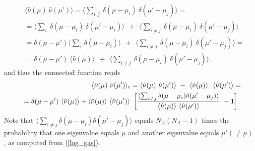 \documentclass[aps,prb,preprint,onecolumn,amsmath,amssymb,superscriptaddress,eqsecnum,floatfix,scrartcl]{revtex4-1}
\begin{document}
\begin{eqnarray}\nonumber
&& \langle{\hat \nu}(\mu) \ {\hat \nu}(\mu')\rangle=
\langle \sum_{i,j} \ \delta(\mu-\mu_i) \  \delta(\mu'-\mu_j)\rangle= \\ \nonumber
&&=
\langle \sum_{i} \ \delta(\mu-\mu_i) \  \delta(\mu'-\mu_i)\rangle
\ \ 
+
\ \ 
\langle \sum_{i \not = j} \ \delta(\mu-\mu_i) \  \delta(\mu'-\mu_j)\rangle \\ \nonumber
&& =
\delta(\mu-\mu') 
\langle \sum_{i} \ \delta(\mu-\mu_i) \rangle
\ \ 
+
\ \ 
\langle \sum_{i \not = j} \ \delta(\mu-\mu_i) \  \delta(\mu'-\mu_j)\rangle = \\ 
\label{DEFLevelLevelTwoPointFunction}
&&=
\delta(\mu-\mu')  \ 
\langle {\hat \nu}(\mu) \rangle
\ \ 
+
\ \ 
\langle \sum_{i \not = j} \ \delta(\mu-\mu_i) \  \delta(\mu'-\mu_j)\rangle,
\end{eqnarray}
and thus  the connected function reads 
\begin{eqnarray}\nonumber
&& \langle{ \hat \nu}(\mu) \ {\hat \nu}(\mu')\rangle_c=
\langle{\hat  \nu}(\mu) \ {\hat \nu}(\mu')\rangle
\ - \ 
\langle{\hat \nu}(\mu)\rangle \  \  \langle{\hat \nu}(\mu')\rangle =  \\  \label{RescaledConnectedLevelLevelCorrelatorMu}
&&=
\delta(\mu-\mu')  \
\langle { \hat \nu}(\mu) \rangle
+
\langle{\hat \nu}(\mu)\rangle \    \langle{\hat \nu}(\mu')\rangle  \  
 \left [
{
\langle \sum_{i \not = j}  \delta(\mu-\mu_i)   \delta(\mu'-\mu_j)\rangle 
\over \langle{\hat \nu}(\mu)\rangle \    \langle{\hat \nu}(\mu')\rangle} \ 
- 1
 \right ].
\end{eqnarray}
Note that
$\langle \sum_{i \not = j}  \delta(\mu-\mu_i)   \delta(\mu'-\mu_j)\rangle $ equals  $N_A (N_A-1)$ times the probability that
one eigenvalue equals $\mu$ and another eigenvalue equals $ \mu' (\not = \mu)$, as computed from (\ref{log_gas}).
\end{document}
